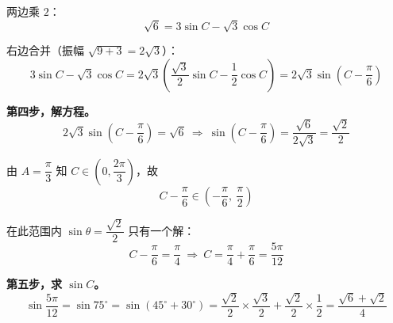 \begin{answer}
两边乘 $2$：
\nopagebreak[4]
\[\sqrt6=3\sin C-\sqrt3\cos C\]

右边合并（振幅 $\sqrt{9+3}=2\sqrt3$）：
\nopagebreak[4]
\[3\sin C-\sqrt3\cos C=2\sqrt3\left(\frac{\sqrt3}2\sin C-\frac12\cos C\right)=2\sqrt3\sin\left(C-\frac\pi6\right)\]

\textbf{第四步，解方程。}
\nopagebreak[4]
\[2\sqrt3\sin\left(C-\frac\pi6\right)=\sqrt6\ \Longrightarrow\ \sin\left(C-\frac\pi6\right)=\frac{\sqrt6}{2\sqrt3}=\frac{\sqrt2}2\]

由 $A=\dfrac\pi3$ 知 $C\in\left(0,\dfrac{2\pi}3\right)$，故
\nopagebreak[4]
\[C-\frac\pi6\in\left(-\frac\pi6,\ \frac\pi2\right)\]

在此范围内 $\sin\theta=\dfrac{\sqrt2}2$ 只有一个解：
\nopagebreak[4]
\[C-\frac\pi6=\frac\pi4\ \Longrightarrow\ C=\frac\pi4+\frac\pi6=\frac{5\pi}{12}\]

\textbf{第五步，求 $\sin C$。}
\nopagebreak[4]
\[\sin\frac{5\pi}{12}=\sin75^\circ=\sin\left(45^\circ+30^\circ\right)=\frac{\sqrt2}2\times\frac{\sqrt3}2+\frac{\sqrt2}2\times\frac12=\frac{\sqrt6+\sqrt2}4\]



\par\medskip

\end{answer}
